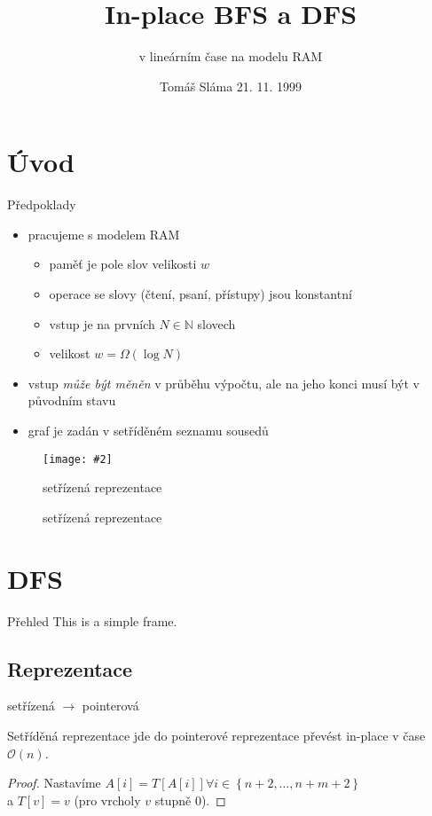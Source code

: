 \documentclass{beamer}
\title{In-place BFS a DFS}
\subtitle{v lineárním čase na modelu RAM}
\date{Tomáš Sláma \hfill 21. 11. 1999} %
\makeatletter
\newcommand{\fitimage}[2][\@nil]{
	\begin{figure}
		\begin{adjustbox}{width=0.9\textwidth, totalheight=\textheight-2\baselineskip-2\baselineskip,keepaspectratio}
			\texttt{[image: \#2]}
		\end{adjustbox}
		\def\tmp{#1}%
	 \ifx\tmp\@nnil
			\else
			\caption{#1}
		\fi
	\end{figure}
}
\makeatother
\begin{document}
	\begin{frame}
		\maketitle
	\end{frame}
	
	\section{Úvod}
	\begin{frame}{Předpoklady}
		\begin{itemize}
			\item pracujeme s modelem RAM
			\begin{itemize}
				\item paměť je pole slov velikosti $w$
				\item operace se slovy (čtení, psaní, přístupy) jsou konstantní
				\item vstup je na prvních $N \in \mathbb{N}$ slovech
				\item velikost $w = \Omega\left(\log N\right)$
			\end{itemize}
			\vfill
			\item vstup \textit{může být měněn} v průběhu výpočtu, ale na jeho konci musí být v původním stavu
			\vfill
			\item graf je zadán v setříděném seznamu sousedů
		\end{itemize}

		\fitimage[setřízená reprezentace]{images/sorted.png}
	\end{frame}

	\section{DFS}
	\begin{frame}{Přehled}
		This is a simple frame.
	\end{frame}

	\subsection{Reprezentace}
	\begin{frame}{setřízená $\rightarrow$ pointerová}
		\begin{lemma}
			Setříděná reprezentace jde do pointerové reprezentace převést in-place v čase $\mathcal{O}\left(n\right)$.
		\end{lemma}

		\begin{proof}
			Nastavíme $A[i] = T\left[A\left[i\right]\right] \forall i \in \left\{n + 2, \ldots, n + m + 2\right\}$ \\
			a $T\left[v\right] = v$ (pro vrcholy $v$ stupně $0$).
		\end{proof}
	\end{frame}
\end{document}

